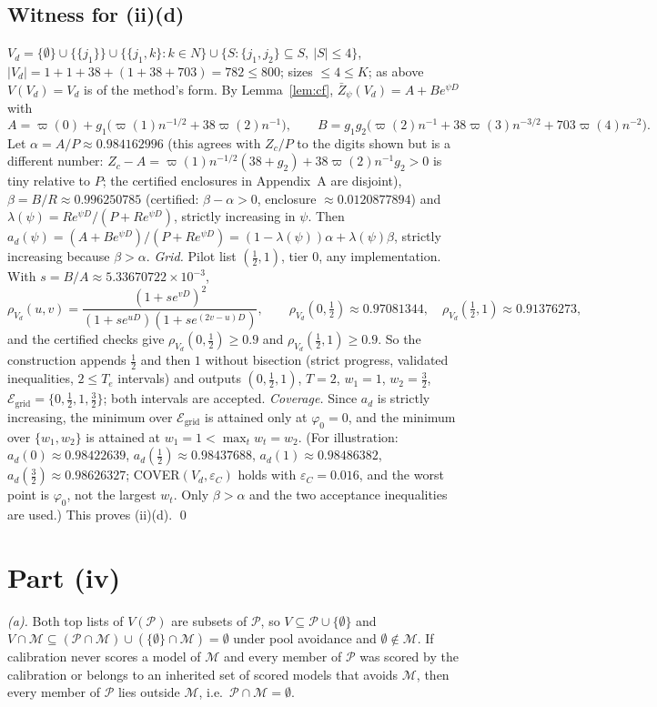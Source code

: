 \documentclass[11pt]{article}
\theoremstyle{remark}
\newcommand{\Zb}{\bar Z}
\newcommand{\E}{\mathcal{E}_{\mathrm{grid}}}
\newcommand{\M}{\mathcal{M}}
\newcommand{\Pool}{\mathcal{P}}
\begin{document}
\subsection{Witness for (ii)(d)}
$V_d=\{\emptyset\}\cup\{\{j_1\}\}\cup\{\{j_1,k\}:k\in N\}\cup\{S:\{j_1,j_2\}\subseteq S,\ |S|\le4\}$, $|V_d|=1+1+38+(1+38+703)=782\le800$; sizes $\le4\le K$; as above $V(V_d)=V_d$ is of the method's form. By Lemma~\ref{lem:cf}, $\Zb_\psi(V_d)=A+Be^{\psi D}$ with
\[
A=\varpi(0)+g_1\bigl(\varpi(1)n^{-1/2}+38\varpi(2)n^{-1}\bigr),\qquad
B=g_1g_2\bigl(\varpi(2)n^{-1}+38\varpi(3)n^{-3/2}+703\varpi(4)n^{-2}\bigr).
\]
Let $\alpha=A/P\approx0.984162996$ (this agrees with $Z_c/P$ to the digits shown but is a different number: $Z_c-A=\varpi(1)n^{-1/2}(38+g_2)+38\varpi(2)n^{-1}g_2>0$ is tiny relative to $P$; the certified enclosures in Appendix~A are disjoint), $\beta=B/R\approx0.996250785$ (certified: $\beta-\alpha>0$, enclosure $\approx0.0120877894$) and $\lambda(\psi)=Re^{\psi D}/(P+Re^{\psi D})$, strictly increasing in $\psi$. Then
$a_d(\psi)=(A+Be^{\psi D})/(P+Re^{\psi D})=(1-\lambda(\psi))\alpha+\lambda(\psi)\beta$, strictly increasing because $\beta>\alpha$.
\emph{Grid.} Pilot list $(\tfrac12,1)$, tier $0$, any implementation. With $s=B/A\approx5.33670722\times10^{-3}$,
\[
\rho_{V_d}(u,v)=\frac{(1+se^{vD})^2}{(1+se^{uD})(1+se^{(2v-u)D})},\qquad
\rho_{V_d}(0,\tfrac12)\approx0.97081344,\quad \rho_{V_d}(\tfrac12,1)\approx0.91376273,
\]
and the certified checks give $\rho_{V_d}(0,\tfrac12)\ge0.9$ and $\rho_{V_d}(\tfrac12,1)\ge0.9$. So the construction appends $\tfrac12$ and then $1$ without bisection (strict progress, validated inequalities, $2\le T_e$ intervals) and outputs $(0,\tfrac12,1)$, $T=2$, $w_1=1$, $w_2=\tfrac32$, $\E=\{0,\tfrac12,1,\tfrac32\}$; both intervals are accepted.
\emph{Coverage.} Since $a_d$ is strictly increasing, the minimum over $\E$ is attained only at $\varphi_0=0$, and the minimum over $\{w_1,w_2\}$ is attained at $w_1=1<\max_tw_t=w_2$. (For illustration: $a_d(0)\approx0.98422639$, $a_d(\tfrac12)\approx0.98437688$, $a_d(1)\approx0.98486382$, $a_d(\tfrac32)\approx0.98626327$; COVER$(V_d,\varepsilon_C)$ holds with $\varepsilon_C=0.016$, and the worst point is $\varphi_0$, not the largest $w_t$. Only $\beta>\alpha$ and the two acceptance inequalities are used.) This proves (ii)(d). \qed

\section{Part (iv)}
\emph{(a).} Both top lists of $V(\Pool)$ are subsets of $\Pool$, so $V\subseteq\Pool\cup\{\emptyset\}$ and $V\cap\M\subseteq(\Pool\cap\M)\cup(\{\emptyset\}\cap\M)=\emptyset$ under pool avoidance and $\emptyset\notin\M$. If calibration never scores a model of $\M$ and every member of $\Pool$ was scored by the calibration or belongs to an inherited set of scored models that avoids $\M$, then every member of $\Pool$ lies outside $\M$, i.e.\ $\Pool\cap\M=\emptyset$.
\end{document}
